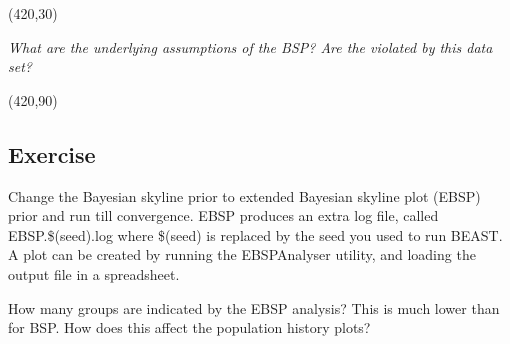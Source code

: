 \documentclass[12pt]{article}
\begin{document}
\vspace{5 mm}
\framebox(420,30){}
\vspace{5 mm}

\textit{What are the underlying assumptions of the BSP? Are the violated by this data set?}
 
\vspace{5 mm}
\framebox(420,90){}
\vspace{5 mm}



\subsection{Exercise}
Change the Bayesian skyline prior to extended Bayesian skyline plot (EBSP) prior and run
till convergence. EBSP produces an extra log file, called EBSP.\$(seed).log where \$(seed)
is replaced by the seed you used to run BEAST.
A plot can be created by running the EBSPAnalyser utility, and loading the output file
in a spreadsheet.

How many groups are indicated by the EBSP analysis?
This is much lower than for BSP. How does this affect the population history plots?

 

\end{document}
